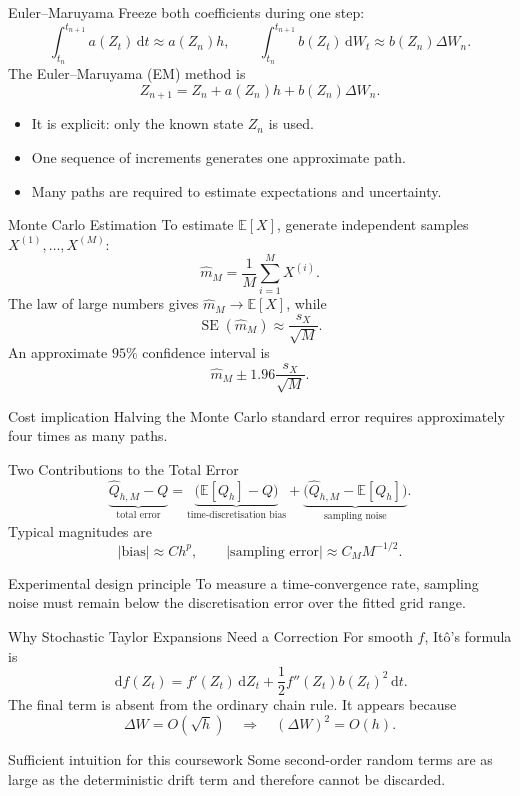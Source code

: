 \documentclass[aspectratio=169,10pt]{beamer}
\newcommand{\E}{\mathbb{E}}
\newcommand{\dd}{\,\mathrm{d}}
\begin{document}
\begin{frame}{Euler--Maruyama}
  Freeze both coefficients during one step:
  \[
    \int_{t_n}^{t_{n+1}}a(Z_t)\dd t\approx a(Z_n)h,\qquad
    \int_{t_n}^{t_{n+1}}b(Z_t)\dd W_t\approx b(Z_n)\Delta W_n.
  \]
  The Euler--Maruyama (EM) method is
  \[
    \boxed{Z_{n+1}=Z_n+a(Z_n)h+b(Z_n)\Delta W_n}.
  \]
  \begin{itemize}
    \item It is explicit: only the known state $Z_n$ is used.
    \item One sequence of increments generates one approximate path.
    \item Many paths are required to estimate expectations and uncertainty.
  \end{itemize}
\end{frame}

\begin{frame}{Monte Carlo Estimation}
  To estimate $\E[X]$, generate independent samples $X^{(1)},\ldots,X^{(M)}$:
  \[
    \widehat m_M=\frac1M\sum_{i=1}^M X^{(i)}.
  \]
  The law of large numbers gives $\widehat m_M\to\E[X]$, while
  \[
    \operatorname{SE}(\widehat m_M)\approx\frac{s_X}{\sqrt M}.
  \]
  An approximate $95\%$ confidence interval is
  \[
    \boxed{\widehat m_M\pm1.96\frac{s_X}{\sqrt M}}.
  \]
  \begin{alertblock}{Cost implication}
    Halving the Monte Carlo standard error requires approximately four times as many paths.
  \end{alertblock}
\end{frame}

\begin{frame}{Two Contributions to the Total Error}
  \[
    \underbrace{\widehat Q_{h,M}-Q}_{\text{total error}}
    =
    \underbrace{\bigl(\E[Q_h]-Q\bigr)}_{\text{time-discretisation bias}}
    +
    \underbrace{\bigl(\widehat Q_{h,M}-\E[Q_h]\bigr)}_{\text{sampling noise}}.
  \]
  Typical magnitudes are
  \[
    |\text{bias}|\approx Ch^p,
    \qquad
    |\text{sampling error}|\approx C_M M^{-1/2}.
  \]
  \begin{block}{Experimental design principle}
    To measure a time-convergence rate, sampling noise must remain below the
    discretisation error over the fitted grid range.
  \end{block}
\end{frame}

\begin{frame}{Why Stochastic Taylor Expansions Need a Correction}
  For smooth $f$, It\^o's formula is
  \[
    \dd f(Z_t)
      =f'(Z_t)\dd Z_t+\frac12f''(Z_t)b(Z_t)^2\dd t.
  \]
  The final term is absent from the ordinary chain rule. It appears because
  \[
    \Delta W=O(\sqrt h)
    \quad\Longrightarrow\quad
    (\Delta W)^2=O(h).
  \]
  \begin{block}{Sufficient intuition for this coursework}
    Some second-order random terms are as large as the deterministic drift term
    and therefore cannot be discarded.
  \end{block}
\end{frame}
\end{document}
